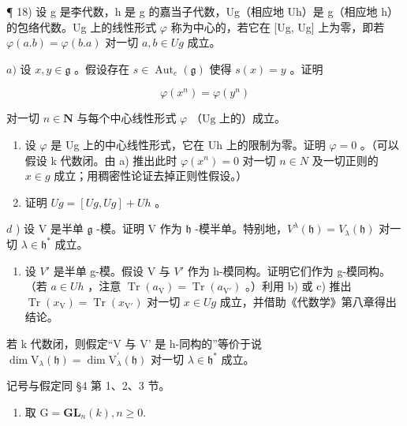 ¶ 18) 设 g 是李代数，h 是 g 的嘉当子代数，Ug（相应地 Uh）是 g（相应地 h）的包络代数。Ug 上的线性形式 \(\varphi\) 称为中心的，若它在 {[}Ug, Ug{]} 上为零，即若 \(\varphi(a.b) = \varphi(b.a)\) 对一切 \(a, b \in Ug\) 成立。

\(a)\) 设 \(x, y \in \mathfrak{g}\) 。假设存在 \(s \in \operatorname{Aut}_e(\mathfrak{g})\) 使得 \(s(x) = y\) 。证明

\[
\varphi (x ^ {n}) = \varphi (y ^ {n})
\]

对一切 \(n \in \mathbf{N}\) 与每个中心线性形式 \(\varphi\) （\(\mathrm{Ug}\) 上的）成立。

\begin{enumerate}
\def\labelenumi{\alph{enumi})}
\setcounter{enumi}{1}
\item
  设 \(\varphi\) 是 Ug 上的中心线性形式，它在 Uh 上的限制为零。证明 \(\varphi = 0\) 。（可以假设 k 代数闭。由 a) 推出此时 \(\varphi(x^{n}) = 0\) 对一切 \(n \in N\) 及一切正则的 \(x \in g\) 成立；用稠密性论证去掉正则性假设。）
\item
  证明 \(Ug = [Ug, Ug] + Uh\) 。
\end{enumerate}

\(d\) ) 设 V 是半单 \(\mathfrak{g}\) -模。证明 V 作为 \(\mathfrak{h}\) -模半单。特别地，\(V^{\lambda}(\mathfrak{h}) = V_{\lambda}(\mathfrak{h})\) 对一切 \(\lambda \in \mathfrak{h}^{*}\) 成立。

\begin{enumerate}
\def\labelenumi{\alph{enumi})}
\setcounter{enumi}{4}
\tightlist
\item
  设 \(V'\) 是半单 g-模。假设 V 与 \(V'\) 作为 h-模同构。证明它们作为 g-模同构。（若 \(a \in Uh\) ，注意 \(\operatorname{Tr}(a_{\mathrm{V}}) = \operatorname{Tr}(a_{\mathrm{V}'})\) 。）利用 b) 或 c) 推出 \(\operatorname{Tr}(x_{\mathrm{V}}) = \operatorname{Tr}(x_{\mathrm{V}'})\) 对一切 \(x \in Ug\) 成立，并借助《代数学》第八章得出结论。
\end{enumerate}

若 k 代数闭，则假定“V 与 V' 是 h-同构的”等价于说 \(\dim\mathrm{V}_{\lambda}(\mathfrak{h})=\dim\mathrm{V}_{\lambda}^{\prime}(\mathfrak{h})\) 对一切 \(\lambda\in\mathfrak{h}^{*}\) 成立。


记号与假定同 §4 第 1、2、3 节。

\begin{enumerate}
\def\labelenumi{\arabic{enumi})}
\tightlist
\item
  取 \(\mathrm{G} = \mathbf{GL}_{n}(k), n \geq 0.\)
\end{enumerate}

